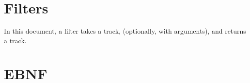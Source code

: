 \documentclass[10pt, twoside]{article}
\newcommand{\secname}{}
\let\stdsection\section
\newcommand{\newsection}[1]{\clearpage\setcounter{numpar}{0}\stdsection{#1}\renewcommand{\secname}{#1}}
\renewcommand{\section}{\clearpage\setcounter{numpar}{0}\stdsection}
\newcounter{numpar}
\begin{document}
\tableofcontents

\renewcommand\section{\newsection}










\section{Filters}

In this document, a filter takes a track, (optionally, with arguments), and returns a track.

\section{EBNF}
\renewcommand{\section}{\clearpage\setcounter{numpar}{0}\stdsection}
\end{document}
